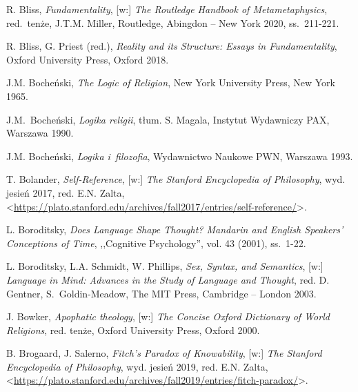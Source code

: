 \begin{thebibliography}{100}
R. Bliss, \textit{Fundamentality}, [w:] \textit{The Routledge Handbook of Metametaphysics}, red.~tenże, J.T.M. Miller, Routledge, Abingdon -- New York 2020, ss.~211-221.

R. Bliss, G. Priest (red.), \textit{Reality and its Structure: Essays in Fundamentality}, Oxford University Press, Oxford 2018.

J.M. Bocheński, \textit{The Logic of Religion}, New York University Press, New York 1965.

J.M.~Bocheński, \textit{Logika religii}, tłum. S. Magala, Instytut Wydawniczy PAX, Warszawa 1990.

J.M. Bocheński, \textit{Logika i~filozofia}, Wydawnictwo Naukowe PWN, Warszawa 1993.


T. Bolander, \textit{Self-Reference}, [w:] \textit{The Stanford Encyclopedia of Philosophy},
wyd. jesień 2017, red. E.N. Zalta, {\textless}\url{https://plato.stanford.edu/archives/fall2017/entries/self-reference/}{\textgreater}.

L. Boroditsky, \textit{Does Language Shape Thought? Mandarin and English Speakers' Conceptions of Time}, ,,Cognitive Psychology'', vol. 43 (2001), ss.~1-22.

L. Boroditsky, L.A. Schmidt, W. Phillips, \textit{Sex, Syntax, and Semantics},
[w:] \textit{Language in Mind: Advances in the Study of Language and Thought}, red. D. Gentner, S.~Goldin-Meadow, The MIT Press, Cambridge -- London 2003.

J. Bowker, \textit{Apophatic theology}, [w:] \textit{The Concise Oxford Dictionary of World Religions}, red. tenże, Oxford University Press, Oxford 2000.


B. Brogaard, J. Salerno, \textit{Fitch's Paradox of Knowability}, [w:] \textit{The Stanford Encyclopedia of Philosophy},
wyd. jesień 2019, red. E.N. Zalta, <\url{https://plato.stanford.edu/archives/fall2019/entries/fitch-paradox/}>.


\end{thebibliography}
